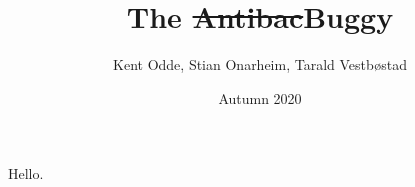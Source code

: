 \documentclass{beamer}
\title{The \sout{Antibac}Buggy}
\author{Kent Odde, Stian Onarheim, Tarald Vestbøstad}
\institute{USN}
\date{Autumn 2020}
\begin{document}
\frame{\titlepage}

\begin{frame}
Hello.
\end{frame}
\end{document}
